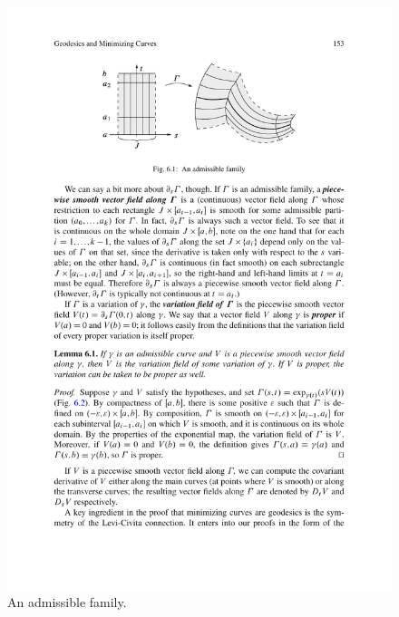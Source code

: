 \begin{figure}[htbp]
\centering
\includegraphics{pictures/admissible-family}
\caption{An admissible family.}
\end{figure}

